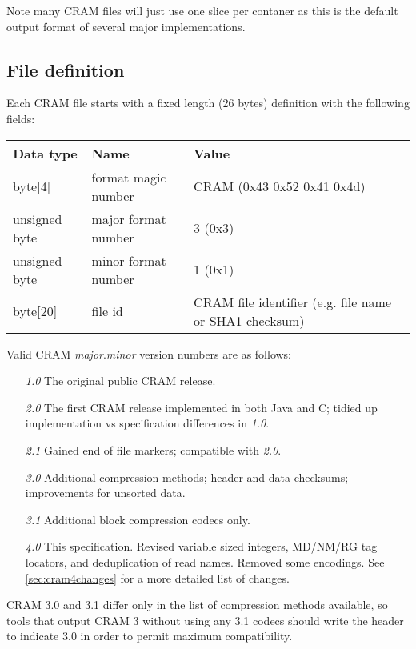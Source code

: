\documentclass[a4paper]{article}
\begin{document}
Note many CRAM files will just use one slice per contaner as this is
the default output format of several major implementations.

\subsection{File definition}

Each CRAM file starts with a fixed length (26 bytes) definition with the following 
fields:

\begin{tabular}{|l|l|l|}
\hline
\textbf{Data type} & \textbf{Name} & \textbf{Value}\tabularnewline
\hline
byte[4] & format magic number & CRAM (0x43 0x52 0x41 0x4d)\tabularnewline
\hline
unsigned byte & major format number & 3 (0x3)\tabularnewline
\hline
unsigned byte & minor format number & 1 (0x1)\tabularnewline
\hline
byte[20] & file id & CRAM file identifier (e.g. file name or SHA1 checksum)\tabularnewline
\hline
\end{tabular}

Valid CRAM \textit{major}.\textit{minor} version numbers are as follows:

\begin{itemize}
\item[\textit{1.0}]
The original public CRAM release.

\item[\textit{2.0}]
The first CRAM release implemented in both Java and C; tidied up
implementation vs specification differences in \textit{1.0}.

\item[\textit{2.1}]
Gained end of file markers; compatible with \textit{2.0}.

\item[\textit{3.0}]
Additional compression methods; header and data checksums;
improvements for unsorted data.

\item[\textit{3.1}]
Additional block compression codecs only.

\item[\textit{4.0}]
This specification.  Revised variable sized integers, MD/NM/RG tag
locators, and deduplication of read names.  Removed some encodings.
See \ref{sec:cram4changes} for a more detailed list of changes.
\end {itemize}

CRAM 3.0 and 3.1 differ only in the list of compression
methods available, so tools that output CRAM 3 without using any 3.1
codecs should write the header to indicate 3.0 in order to permit
maximum compatibility.
\end{document}

